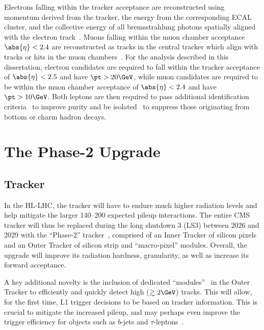 Electrons falling within the tracker acceptance are reconstructed using momentum derived from the tracker, the energy from the corresponding ECAL cluster, and the collective energy of all bremsstrahlung photons spatially aligned with the electron track~\cite{Khachatryan:2015hwa}.
Muons falling within the muon chamber acceptance $\abs{\eta} < 2.4$ are reconstructed as tracks in the central tracker which align with tracks or hits in the muon chambers~\cite{CMS:2018rym}.
For the analysis described in this dissertation, electron candidates are required to fall within the tracker acceptance of $\abs{\eta} < 2.5$ and have $\pt > 20 \GeV$, while muon candidates are required to be within the muon chamber acceptance of $\abs{\eta} < 2.4$ and have $\pt > 10 \GeV$.
Both leptons are then required to pass additional identification criteria~\cite{Khachatryan:2015hwa, CMS:2018rym} to improve purity and be isolated~\cite{CMS:2017yfk} to suppress those originating from bottom or charm hadron decays.

\section{The Phase-2 Upgrade}
\label{sec:02_cms_phase2}

\subsection{Tracker}
\label{sec:02_cms_phase2_tracker}

In the HL-LHC, the tracker will have to endure much higher radiation levels and help mitigate the larger 140--200 expected pileup interactions.
The entire CMS tracker will thus be replaced during the long shutdown 3 (LS3) between 2026 and 2029 with the ``Phase-2'' tracker~\cite{CMS:2017lum}, comprised of an Inner Tracker of silicon pixels and an Outer Tracker of silicon strip and ``macro-pixel'' modules.
Overall, the upgrade will improve its radiation hardness, granularity, as well as increase its forward acceptance.

A key additional novelty is the inclusion of dedicated ``\pt modules''~\cite{foudas2005studytrackingtriggerlevel} in the Outer Tracker to efficiently and quickly detect high \pt ($\gtrsim 2\GeV$) tracks.
This will allow, for the first time, L1 trigger decisions to be based on tracker information.
This is crucial to mitigate the increased pileup, and may perhaps even improve the trigger efficiency for objects such as $b$-jets and $\tau$-leptons~\cite{chambers2023neural}.

